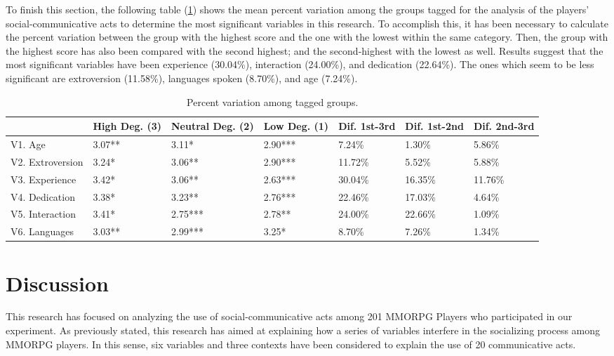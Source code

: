 \documentclass[english]{textolivre}
\begin{document}
\begin{enumerate}
\end{enumerate}

To finish this section, the following table (\ref{figure9}) shows the mean percent variation among the groups tagged for the analysis of the players' social-communicative acts to determine the most significant variables in this research. To accomplish this, it has been necessary to calculate the percent variation between the group with the highest score and the one with the lowest within the same category. Then, the group with the highest score has also been compared with the second highest; and the second-highest with the lowest as well. Results suggest that the most significant variables have been experience (30.04\%), interaction (24.00\%), and dedication (22.64\%). The ones which seem to be less significant are extroversion (11.58\%), languages spoken (8.70\%), and age (7.24\%). 

\begin{table}[htpb]
\caption{Percent variation among tagged groups.}
\label{figure9}
\centering
\begin{tabular}{p{}p{}p{}p{}p{}p{}p{}}
\toprule
& High Deg. (3) & Neutral Deg. (2) & Low Deg. (1) & Dif. 1st-3rd & Dif. 1st-2nd & Dif. 2nd-3rd
\\ 
\midrule
V1. Age & 3.07** & 3.11* & 2.90*** & 7.24\% & 1.30\% & 5.86\%
\\
V2. Extroversion & 3.24* & 3.06** & 2.90*** & 11.72\% & 5.52\% & 5.88\% 
\\
V3. Experience & 3.42* & 3.06** & 2.63*** & 30.04\% & 16.35\% & 11.76\%
\\
V4. Dedication & 3.38* & 3.23** & 2.76*** & 22.46\% & 17.03\% & 4.64\%
\\
V5. Interaction & 3.41* & 2.75*** & 2.78** & 24.00\% & 22.66\% & 1.09\%
\\
V6. Languages & 3.03** & 2.99*** & 3.25* & 8.70\% & 7.26\% & 1.34\%
\\
\bottomrule
\end{tabular}
{}
\end{table}


\section{Discussion}
This research has focused on analyzing the use of social-communicative acts among 201 MMORPG Players who participated in our experiment. As previously stated, this research has aimed at explaining how a series of variables interfere in the socializing process among MMORPG players. In this sense, six variables and three contexts have been considered to explain the use of 20 communicative acts.
\end{document}
